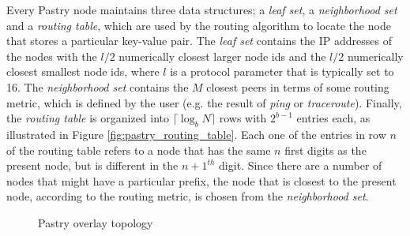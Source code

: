 \documentclass[a4paper,11pt,twoside]{report}
\begin{document}
Every Pastry node maintains three data structures; a \textit{leaf set}, a \textit{neighborhood set} and a \textit{routing table}, which are used by the routing algorithm to locate the node that stores a particular key-value pair. The \textit{leaf set} contains the IP addresses of the nodes with the $l/2$ numerically closest larger node ids and the $l/2$ numerically closest smallest node ids, where $l$ is a protocol parameter that is typically set to 16. The \textit{neighborhood set} contains the $M$ closest peers in terms of some routing metric, which is defined by the user (e.g. the result of \textit{ping} or \textit{traceroute}). Finally, the \textit{routing table} is organized into $\lceil{\log _b N}\rceil$ rows with $2^{b-1}$ entries each, as illustrated in Figure \ref{fig:pastry_routing_table}. Each one of the entries in row $n$ of the routing table refers to a node that has the same $n$ first digits as the present node, but is different in the $n+1^{th}$ digit. Since there are a number of nodes that might have a particular prefix, the node that is closest to the present node, according to the routing metric, is chosen from the \textit{neighborhood set}.

\begin{figure}[h]
\centering
{}\hfill
{}
\caption{Pastry overlay topology}
\label{fig:pastry_figures}
\end{figure}
\end{document}
